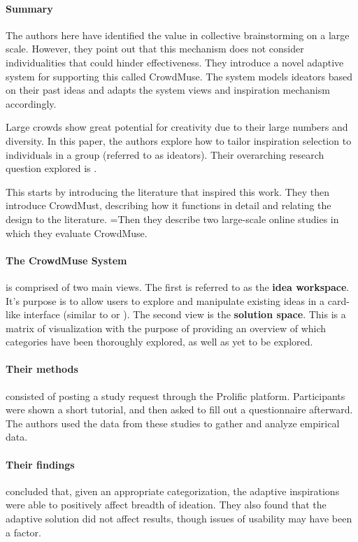 \paragraph{Summary}
The authors here have identified the value in collective brainstorming on a large scale. However, they point out that this mechanism does not consider individualities that could hinder effectiveness. They introduce a novel adaptive system for supporting this called CrowdMuse. The system models ideators based on their past ideas and adapts the system views and inspiration mechanism accordingly.

Large crowds show great potential for creativity due to their large numbers and diversity. In this paper, the authors explore how to tailor inspiration selection to individuals in a group (referred to as ideators). Their overarching research question explored is .

This starts by introducing the literature that inspired this work. They then introduce CrowdMust, describing how it functions in detail and relating the design to the literature. =Then they describe two large-scale online studies in which they evaluate CrowdMuse.

\paragraph{The CrowdMuse System} is comprised of two main views. The first is referred to as the \textbf{idea workspace}. It's purpose is to allow users to explore and manipulate existing ideas in a card-like interface (similar to  or ). The second view is the \textbf{solution space}. This is a matrix of visualization with the purpose of providing an overview of which categories have been thoroughly explored, as well as yet to be explored.

\paragraph{Their methods} consisted of posting a study request through the Prolific platform. Participants were shown a short tutorial, and then asked to fill out a questionnaire afterward. The authors used the data from these studies to gather and analyze empirical data.

\paragraph{Their findings} concluded that, given an appropriate categorization, the adaptive inspirations were able to positively affect breadth of ideation. They also found that the adaptive solution did not affect results, though issues of usability may have been a factor.


